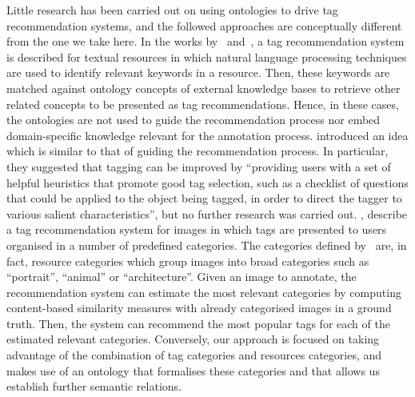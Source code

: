 Little research has been carried out on using ontologies to drive tag recommendation systems, and the followed approaches are conceptually different from the one we take here.
In the works by~\cite{Adrian2007} and~\cite{Prokofyev2012}, a tag recommendation system is described for textual resources in which natural language processing techniques are used to identify relevant keywords in a resource. Then, these keywords are matched against ontology concepts of external knowledge bases to retrieve other related concepts to be presented as tag recommendations. Hence, in these cases, the ontologies are not used to guide the recommendation process nor embed domain-specific knowledge relevant for the annotation process.
\cite{Guy2006} introduced an idea which is similar to that of guiding the recommendation process. In particular, they suggested that tagging can be improved by ``providing users with a set of helpful heuristics that promote good tag selection, such as a checklist of questions that could be applied to the object being tagged, in order to direct the tagger to various salient characteristics'', but no further research was carried out.
\cite{Chen2008a}, describe a tag recommendation system for images in which tags are presented to users organised in a number of predefined categories. The categories defined by~\cite{Chen2008a} are, in fact, resource categories which group images into broad categories such as ``portrait'', ``animal'' or ``architecture''. Given an image to annotate, the recommendation system can estimate the most relevant categories by computing content-based similarity measures with already categorised images in a ground truth. Then, the system can recommend the most popular tags for each of the estimated relevant categories.
Conversely, our approach is focused on taking advantage of the combination of tag categories and resources categories, and makes use of an ontology that formalises these categories and that allows us establish further semantic relations.

